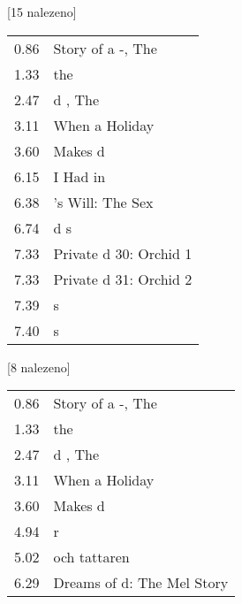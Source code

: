 \begin{table}[H]
\begin{tt}

\horizlina

\noindent
\begin{minipage}[t]{.5\textwidth}\vspace{0pt}
 [15 nalezeno]\vspace{5pt}

\begin{tabulary}{1.1\textwidth}{LL}
0.86 & Story of a -, The \\
1.33 &  the  \\
2.47 & d , The \\
3.11 & When   a Holiday \\
3.60 &  Makes d \\
6.15 & I Had  in  \\
6.38 & 's Will: The Sex  \\
6.74 & d s \\
7.33 & Private d 30:  Orchid 1 \\
7.33 & Private d 31:  Orchid 2 \\
7.39 &  s \\
7.40 &  s \\
\end{tabulary}
\end{minipage}
\begin{minipage}[t]{.5\textwidth}\vspace{0pt}
 [8 nalezeno]\vspace{5pt}

\begin{tabulary}{1.1\textwidth}{LL}
0.86 & Story of a -, The \\
1.33 &  the  \\
2.47 & d , The \\
3.11 & When   a Holiday \\
3.60 &  Makes d \\
4.94 &  r \\
5.02 &   och tattaren \\
6.29 & Dreams of d: The Mel  Story \\
\end{tabulary}
\end{minipage}


\end{tt}
\end{table}
